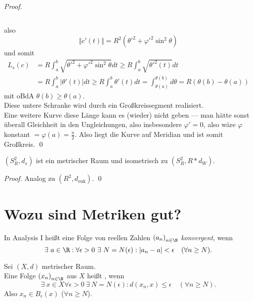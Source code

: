 \begin{lemma}
\begin{proof}
\begin{small}
\begin{equation*}
      \end{equation*}
    \end{small}
    also
    \begin{equation*}
      \Vert c'(t) \Vert = R^2({\theta'}^2 + {\varphi'}^2\sin^2\theta)
    \end{equation*}
    und somit
    \begin{align*}
      L_s(c) &= R\int_a^b\sqrt{{\theta'}^2+{\varphi'}^2\sin^2\theta}dt \geq R\int_a^b\sqrt{{\theta'}^2(t)}dt \\
      &= R\int_a^b \vert \theta'(t) \vert dt \geq R\int_a^b \theta'(t)dt = \int_{\theta(a)}^{\theta(b)}d\theta = R(\theta(b)-\theta(a))
    \end{align*}
    mit oBdA \( \theta(b) \geq \theta(a) \). \\
    Diese untere Schranke wird durch ein Großkreissegment realisiert. \\
    Eine weitere Kurve diese Länge kann es (wieder) nicht geben --- man hätte sonst überall Gleichheit in den Ungleichungen, also insbesondere \( \varphi' = 0 \), also wäre \( \varphi \) konstant \( = \varphi(a) = \frac{\pi}{2} \). Also liegt die Kurve auf Meridian und ist somit Großkreis. \qed{}
  \end{proof}
\end{lemma}

\begin{theorem}
  \( (S^2_R, d_s) \) ist ein metrischer Raum und isometrisch zu \( (S^2_R, R*d_W) \).
  \begin{proof}
    Analog zu \( (R^2, d_\text{euk}) \). \qed{}
  \end{proof}
\end{theorem}

\section{Wozu sind Metriken gut?}

\begin{remark}
  In Analysis I heißt eine Folge von reellen Zahlen \( {(a_n)}_{n \in \N} \) \emph{konvergent}, wenn
  \begin{equation*}
    \exists \ a \in \R : \forall \epsilon > 0 \ \exists \ N = N(\epsilon) : \vert a_n - a \vert < \epsilon \quad (\forall n \geq N)\text{.}
  \end{equation*}
\end{remark}

\begin{remark}
  Sei \( (X, d) \) metrischer Raum. \\
  Eine Folge \( {(x_n)}_{n \in \N} \) aus \( X \) heißt , wenn
  \begin{equation*}
    \exists \ x \in X \forall \epsilon > 0 \ \exists \ N = N(\epsilon) : d(x_n, x) \leq \epsilon \quad (\forall n \geq N)\text{.}
  \end{equation*}
  Also \( x_n \in B_\epsilon(x) \) (\( \forall n \geq N \)).
\end{remark}

